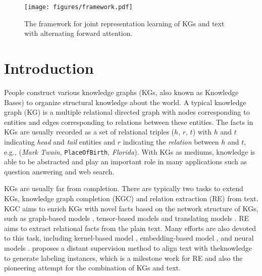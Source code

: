 \documentclass[letterpaper]{article} %
\begin{document}
\begin{figure*}[t]
\centering
\texttt{[image: figures/framework.pdf]}
\caption{The framework for joint representation learning of KGs and text with alternating forward attention.}
\label{fig:joinglearning}
\end{figure*}

\section{Introduction}
\label{intro}

People construct various knowledge graphs (KGs, also known as Knowledge Bases) to organize structural knowledge about the world. A typical knowledge graph (KG) is a multiple relational directed graph with nodes corresponding to entities and edges corresponding to relations between these entities. The facts in KGs are usually recorded as a set of relational triples ($h$, $r$, $t$) with $h$ and $t$ indicating \emph{head} and \emph{tail} entities and $r$ indicating the \emph{relation} between $h$ and $t$, e.g., (\emph{Mark Twain}, \texttt{PlaceOfBirth}, \emph{Florida}). With KGs as mediums, knowledge is able to be abstracted and play an important role in many applications such as question answering and web search.

KGs are usually far from completion. There are typically two tasks to extend KGs, knowledge graph completion (KGC) and relation extraction (RE) from text. KGC aims to enrich KGs with novel facts based on the network structure of KGs, such as graph-based models \cite{lao2010relational,lao2011random}, tensor-based models \cite{socher2013reasoning,nickel2016holographic} and translating models \cite{bordes2013translating,ji2015knowledge}. RE aims to extract relational facts from the plain text. Many efforts are also devoted to this task, including kernel-based model \cite{zelenko2003kernel}, embedding-based model \cite{gormley2015improved}, and neural models \cite{socher2012semantic,zeng2014relation}. \cite{mintz2009distant} proposes a distant supervision method to align text with theknowledge to generate labeling instances, which is a milestone work for RE and also the pioneering attempt for the combination of KGs and text.

\end{document}
